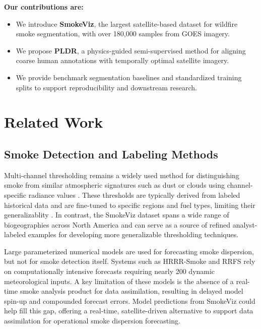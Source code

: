 \documentclass{article}
\begin{document}
\textbf{Our contributions are:}
\begin{itemize}
    \item We introduce \textbf{SmokeViz}, the largest satellite-based dataset for wildfire smoke segmentation, with over 180,000 samples from GOES imagery.
    \item We propose \textbf{PLDR}, a physics-guided semi-supervised method for aligning coarse human annotations with temporally optimal satellite imagery.
    \item We provide benchmark segmentation baselines and standardized training splits to support reproducibility and downstream research.
\end{itemize}

\section{Related Work}

\subsection{Smoke Detection and Labeling Methods}

Multi-channel thresholding remains a widely used method for distinguishing smoke from similar atmospheric signatures such as dust or clouds using channel-specific radiance values \cite{threshold}. These thresholds are typically derived from labeled historical data and are fine-tuned to specific regions and fuel types, limiting their generalizablity \cite{thresh_geog}. In contrast, the SmokeViz dataset spans a wide range of biogeographies across North America and can serve as a source of refined analyst-labeled examples for developing more generalizable thresholding techniques.

Large parameterized numerical models are used for forecasting smoke dispersion, but not for smoke detection itself. Systems such as HRRR-Smoke and RRFS \cite{hrrr, rrfs} rely on computationally intensive forecasts requiring nearly 200 dynamic meteorological inputs. A key limitation of these models is the absence of a real-time smoke analysis product for data assimilation, resulting in delayed model spin-up and compounded forecast errors. Model predictions from SmokeViz could help fill this gap, offering a real-time, satellite-driven alternative to support data assimilation for operational smoke dispersion forecasting.
\end{document}
